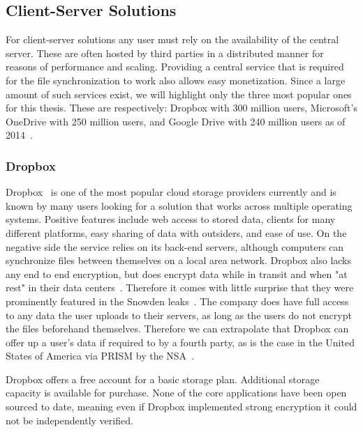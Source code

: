\subsection{Client-Server Solutions}
\label{sub:Client-Server Solutions}

For client-server solutions any user must rely on the availability of the central server.
These are often hosted by third parties in a distributed manner for reasons of performance and scaling.
Providing a central service that is required for the file synchronization to work also allows easy monetization.
Since a large amount of such services exist, we will highlight only the three most popular ones for this thesis.
These are respectively: Dropbox with 300 million users, Microsoft's OneDrive with 250 million users, and Google Drive with 240 million users as of 2014~\cite{web:site:fortune}.

\subsubsection{Dropbox}
\label{subs:Dropbox}

Dropbox~\cite{web:site:dropbox} is one of the most popular cloud storage providers currently and is known by many users looking for a solution that works across multiple operating systems.
Positive features include web access to stored data, clients for many different platforms, easy sharing of data with outsiders, and ease of use.
On the negative side the service relies on its back-end servers, although computers can synchronize files between themselves on a local area network.
Dropbox also lacks any end to end encryption, but does encrypt data while in transit and when "at rest" in their data centers~\cite{web:site:dropbox:blog}.
Therefore it comes with little surprise that they were prominently featured in the Snowden leaks~\cite{web:site:rt:dropbox}.
The company does have full access to any data the user uploads to their servers, as long as the users do not encrypt the files beforehand themselves.
Therefore we can extrapolate that Dropbox can offer up a user's data if required to by a fourth party, as is the case in the United States of America via PRISM by the NSA~\cite{web:site:wp:internet_giants}.

Dropbox offers a free account for a basic storage plan.
Additional storage capacity is available for purchase.
None of the core applications have been open sourced to date, meaning even if Dropbox implemented strong encryption it could not be independently verified.

